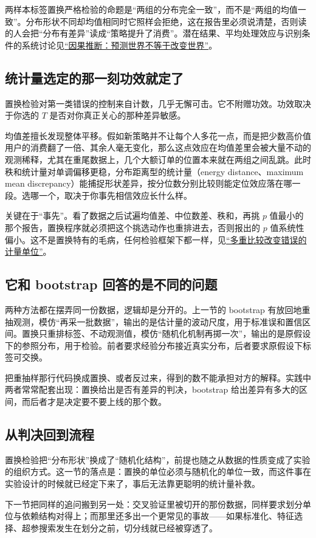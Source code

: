 两样本标签置换严格检验的命题是``两组的分布完全一致''，而不是``两组的均值一致''。分布形状不同却均值相同时它照样会拒绝，这在报告里必须说清楚，否则读的人会把``分布有差异''读成``策略提升了消费''。潜在结果、平均处理效应与识别条件的系统讨论见\hyperref[ch:120]{``因果推断：预测世界不等于改变世界''}。

\subsection{统计量选定的那一刻功效就定了}

置换检验对第一类错误的控制来自计数，几乎无懈可击。它不附赠功效。功效取决于你选的 \(T\) 是否对你真正关心的那种差异敏感。

均值差擅长发现整体平移。假如新策略并不让每个人多花一点，而是把少数高价值用户的消费翻了一倍、其余人毫无变化，那么这点效应在均值差里会被大量不动的观测稀释，尤其在重尾数据上，几个大额订单的位置本来就在两组之间乱跳。此时秩和统计量对单调偏移更稳，分布距离型的统计量（energy distance、maximum mean discrepancy）能捕捉形状差异，按分位数分别比较则能定位效应落在哪一段。选哪一个，取决于你事先相信效应长什么样。

关键在于``事先''。看了数据之后试遍均值差、中位数差、秩和，再挑 \(p\) 值最小的那个报告，置换程序就必须把这个挑选动作也重排进去，否则报出的 \(p\) 值系统性偏小。这不是置换特有的毛病，任何检验框架下都一样，见\hyperref[sec:11-Mathematical-Statistics/05-Hypothesis-Testing/04]{``多重比较改变错误的计量单位''}。

\subsection{它和 bootstrap 回答的是不同的问题}

两种方法都在摆弄同一份数据，逻辑却是分开的。上一节的 bootstrap 有放回地重抽观测，模仿``再采一批数据''，输出的是估计量的波动尺度，用于标准误和置信区间。置换只重排标签、不动观测值，模仿``随机化机制再掷一次''，输出的是原假设下的参照分布，用于检验。前者要求经验分布接近真实分布，后者要求原假设下标签可交换。

把重抽样那行代码换成置换、或者反过来，得到的数不能承担对方的解释。实践中两者常常配套出现：置换给出是否有差异的判决，bootstrap 给出差异有多大的区间，而后者才是决定要不要上线的那个数。

\subsection{从判决回到流程}

置换检验把``分布形状''换成了``随机化结构''，前提也随之从数据的性质变成了实验的组织方式。这一节的落点是：置换的单位必须与随机化的单位一致，而这件事在实验设计的时候就已经定下来了，事后无法靠更聪明的统计量补救。

下一节把同样的追问搬到另一处：交叉验证里被切开的那份数据，同样要求划分单位与依赖结构对得上；而那里还多出一个更常见的事故——如果标准化、特征选择、超参搜索发生在划分之前，切分线就已经被穿透了。
